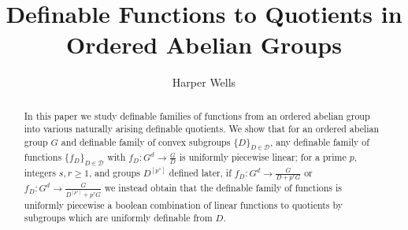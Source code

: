 \documentclass[a4paper,11pt]{article}
\begin{document}
	
	\title{Definable Functions to Quotients in Ordered Abelian Groups}
	\author{Harper Wells}
	\date{}
	\maketitle
	\begin{abstract}
    In this paper we study definable families of functions from an ordered abelian group into various naturally arising definable quotients. We show that for an ordered abelian group $G$ and definable family of convex subgroups $\{D\}_{D\in\mathcal{D}}$, any definable family of functions $\{f_D\} _{D\in\mathcal{D}}$ with $f_D:G^d\rightarrow\frac{G}{D}$ is uniformly piecewise linear; for a prime $p$, integers $s,r\geq 1$, and groups $D^{[p^s]}$ defined later, if $f_D:G^d\rightarrow\frac{G}{D+p^rG}$ or $f_D:G^d\rightarrow\frac{G}{D^{[p^s]}+p^rG}$ we instead obtain that the definable family of functions is uniformly piecewise a boolean combination of linear functions to quotients by subgroups which are uniformly definable from $D$.
    \end{abstract}
\end{document}
